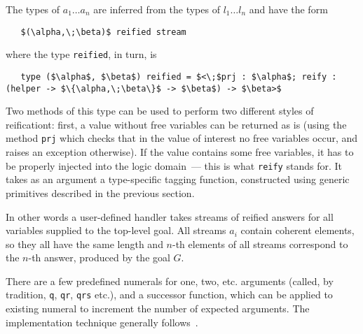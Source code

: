 The types of \mbox{$a_1\dots a_n$} are inferred from the types of \mbox{$l_1\dots l_n$} and
have the form

\begin{lstlisting}
   $(\alpha,\;\beta)$ reified stream
\end{lstlisting}

\noindent where the type \lstinline{reified}, in turn, is

\begin{lstlisting}
   type ($\alpha$, $\beta$) reified = $<\;$prj : $\alpha$; reify : (helper -> $\{\alpha,\;\beta\}$ -> $\beta$) -> $\beta>$
\end{lstlisting}

Two methods of this type can be used to perform two different styles of reificationt: first, a value without
free variables can be returned as is (using the method \lstinline{prj} which checks that in the value of
interest no free variables occur, and raises an exception otherwise). If the value contains some free
variables, it has to be properly injected into the logic domain~--- this is what \lstinline{reify} stands
for. It takes as an argument a type-specific tagging function, constructed using generic
primitives described in the previous section.

In other words a user-defined handler takes streams of reified answers for all variables supplied to the top-level
goal. All streams $a_i$ contain coherent elements, so they all have the same length and $n$-th elements of all
streams correspond to the $n$-th answer, produced by the goal $G$.

There are a few predefined numerals for one, two, etc. arguments (called, by tradition,
\lstinline{q}, \lstinline{qr}, \lstinline{qrs} etc.), and a successor function, which
can be applied to existing numeral to increment the number of expected arguments. The
implementation technique generally follows~\cite{Unparsing, DoWeNeed}.
